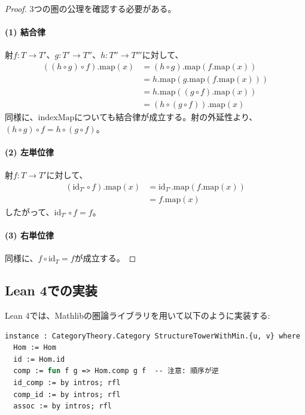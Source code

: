 \documentclass[a4paper,12pt]{article}
\theoremstyle{definition}
\begin{document}
\begin{proof}
3つの圏の公理を確認する必要がある。

\paragraph{(1) 結合律}
射$f : T \to T'$、$g : T' \to T''$、$h : T'' \to T'''$に対して、
\begin{align*}
((h \circ g) \circ f).\text{map}(x) &= (h \circ g).\text{map}(f.\text{map}(x)) \\
&= h.\text{map}(g.\text{map}(f.\text{map}(x))) \\
&= h.\text{map}((g \circ f).\text{map}(x)) \\
&= (h \circ (g \circ f)).\text{map}(x)
\end{align*}
同様に、$\text{indexMap}$についても結合律が成立する。射の外延性より、$(h \circ g) \circ f = h \circ (g \circ f)$。

\paragraph{(2) 左単位律}
射$f : T \to T'$に対して、
\begin{align*}
(\text{id}_{T'} \circ f).\text{map}(x) &= \text{id}_{T'}.\text{map}(f.\text{map}(x)) \\
&= f.\text{map}(x)
\end{align*}
したがって、$\text{id}_{T'} \circ f = f$。

\paragraph{(3) 右単位律}
同様に、$f \circ \text{id}_T = f$が成立する。
\end{proof}

\subsection{Lean 4での実装}

Lean 4では、Mathlibの圏論ライブラリを用いて以下のように実装する:

\begin{lstlisting}[style=leanstyle, language=ML]
instance : CategoryTheory.Category StructureTowerWithMin.{u, v} where
  Hom := Hom
  id := Hom.id
  comp := fun f g => Hom.comp g f  -- 注意: 順序が逆
  id_comp := by intros; rfl
  comp_id := by intros; rfl
  assoc := by intros; rfl
\end{lstlisting}
\end{document}
